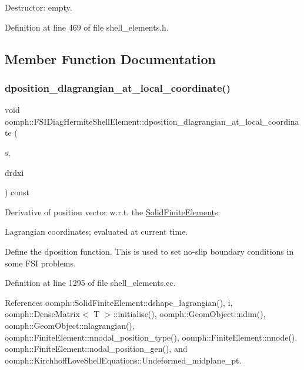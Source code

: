 Destructor\+: empty. 



Definition at line 469 of file shell\+\_\+elements.\+h.



\subsection{Member Function Documentation}
\mbox{\label{classoomph_1_1FSIDiagHermiteShellElement_a96062fcb7f6329ceca0635ee5cc4d5f8}} 
\subsubsection{\texorpdfstring{dposition\+\_\+dlagrangian\+\_\+at\+\_\+local\+\_\+coordinate()}{dposition\_dlagrangian\_at\_local\_coordinate()}}
{\footnotesize\ttfamily void oomph\+::\+F\+S\+I\+Diag\+Hermite\+Shell\+Element\+::dposition\+\_\+dlagrangian\+\_\+at\+\_\+local\+\_\+coordinate (\begin{DoxyParamCaption}\item[{const \hyperlink{classoomph_1_1Vector}{Vector}$<$ double $>$ \&}]{s,  }\item[{\hyperlink{classoomph_1_1DenseMatrix}{Dense\+Matrix}$<$ double $>$ \&}]{drdxi }\end{DoxyParamCaption}) const}



Derivative of position vector w.\+r.\+t. the \hyperlink{classoomph_1_1SolidFiniteElement}{Solid\+Finite\+Element}\textquotesingle{}s. 

Lagrangian coordinates; evaluated at current time.

Define the dposition function. This is used to set no-\/slip boundary conditions in some F\+SI problems. 

Definition at line 1295 of file shell\+\_\+elements.\+cc.



References oomph\+::\+Solid\+Finite\+Element\+::dshape\+\_\+lagrangian(), i, oomph\+::\+Dense\+Matrix$<$ T $>$\+::initialise(), oomph\+::\+Geom\+Object\+::ndim(), oomph\+::\+Geom\+Object\+::nlagrangian(), oomph\+::\+Finite\+Element\+::nnodal\+\_\+position\+\_\+type(), oomph\+::\+Finite\+Element\+::nnode(), oomph\+::\+Finite\+Element\+::nodal\+\_\+position\+\_\+gen(), and oomph\+::\+Kirchhoff\+Love\+Shell\+Equations\+::\+Undeformed\+\_\+midplane\+\_\+pt.




